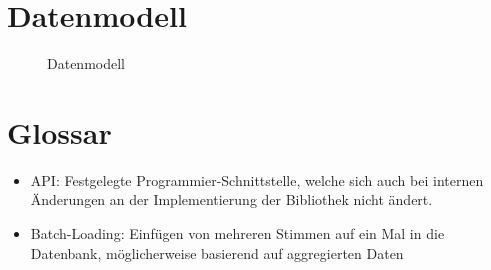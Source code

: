\documentclass[11pt,a4paper]{scrartcl}
\begin{document}
\section{Datenmodell}
\begin{figure}[h!]
    \begin{center}
    \end{center}
    \caption{Datenmodell}
    \label{fig:datenmodell}
\end{figure}
\section{Glossar}
\begin{itemize}
    \item API: Festgelegte Programmier-Schnittstelle, welche sich auch bei
        internen Änderungen an der Implementierung der Bibliothek nicht ändert.
    \item Batch-Loading: Einfügen von mehreren Stimmen auf ein Mal in die
        Datenbank, möglicherweise basierend auf aggregierten Daten
\end{itemize}
\end{document}
